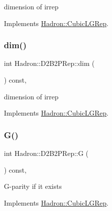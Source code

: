 dimension of irrep 

Implements \mbox{\hyperlink{structHadron_1_1CubicLGRep_a3acbaea26503ed64f20df693a48e4cdd}{Hadron\+::\+Cubic\+L\+G\+Rep}}.

\mbox{\label{structHadron_1_1D2B2PRep_a963b6a6af4da28f02cb06e9ebe7e0273}} 
\subsubsection{\texorpdfstring{dim()}{dim()}\hspace{0.1cm}{\footnotesize\ttfamily [2/2]}}
{\footnotesize\ttfamily int Hadron\+::\+D2\+B2\+P\+Rep\+::dim (\begin{DoxyParamCaption}{ }\end{DoxyParamCaption}) const\hspace{0.3cm}{\ttfamily [inline]}, {\ttfamily [virtual]}}

dimension of irrep 

Implements \mbox{\hyperlink{structHadron_1_1CubicLGRep_a3acbaea26503ed64f20df693a48e4cdd}{Hadron\+::\+Cubic\+L\+G\+Rep}}.

\mbox{\label{structHadron_1_1D2B2PRep_a618a8eb583b83a0dca1bcc219f71e5e7}} 
\subsubsection{\texorpdfstring{G()}{G()}\hspace{0.1cm}{\footnotesize\ttfamily [1/2]}}
{\footnotesize\ttfamily int Hadron\+::\+D2\+B2\+P\+Rep\+::G (\begin{DoxyParamCaption}{ }\end{DoxyParamCaption}) const\hspace{0.3cm}{\ttfamily [inline]}, {\ttfamily [virtual]}}

G-\/parity if it exists 

Implements \mbox{\hyperlink{structHadron_1_1CubicLGRep_ace26f7b2d55e3a668a14cb9026da5231}{Hadron\+::\+Cubic\+L\+G\+Rep}}.

\mbox{\label{structHadron_1_1D2B2PRep_a618a8eb583b83a0dca1bcc219f71e5e7}} 
